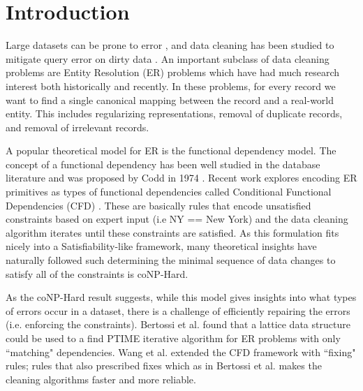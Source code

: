 \section{Introduction}
Large datasets can be prone to error \cite{Gartner}, and data cleaning has been studied to mitigate query error on dirty data \cite{dasu2003exploratory, mayfield2010eracer, openrefine, wrangler, DBLP:conf/sigmod/DallachiesaEEEIOT13, DBLP:conf/pervasive/JefferyAFHW06}.
An important subclass of data cleaning problems are Entity Resolution (ER) problems which have had much research interest both historically and recently. \cite{DBLP:journals/pvldb/KopckeTR10, conf/dmkd/MongeE97, conf/sigmod/WhangMKTG09, conf/acl/FinkelM08, conf/sigmod/WangLF12, Fellegi1969, conf/sigmod/ArasuGK10, DBLP:journals/tkde/ElmagarmidIV07, journals/tkde/Christen11, getoor2005link}
In these problems, for every record we want to find a single canonical mapping between the record and a real-world entity.
This includes regularizing representations, removal of duplicate records, and removal of irrelevant records.

A popular theoretical model for ER is the functional dependency model.
The concept of a functional dependency has been well studied in the database literature 
and was proposed by Codd in 1974 \cite{codd1974recent}.
Recent work explores encoding ER primitives as types of functional dependencies called Conditional Functional Dependencies (CFD) \cite{bertossi2013data, fan2014interaction, fan2008conditional}.
These are basically rules that encode unsatisfied constraints based on expert input (i.e NY == New York) and the data cleaning algorithm iterates until these constraints are satisfied.
As this formulation fits nicely into a Satisfiability-like framework, many theoretical insights have naturally followed such determining the minimal sequence of data changes to satisfy all of the constraints is coNP-Hard. 

As the coNP-Hard result suggests, while this model gives insights into what types of errors occur in a dataset, there is a challenge of efficiently repairing the errors (i.e. enforcing the constraints).
Bertossi et al. \cite{bertossi2013data} found that a lattice data structure could be used to a find PTIME iterative algorithm for ER problems with only ``matching" dependencies.
Wang et al. \cite{wang2014towards} extended the CFD framework with ``fixing" rules; rules that also prescribed fixes which as in Bertossi et al. makes the cleaning algorithms faster and more reliable.

